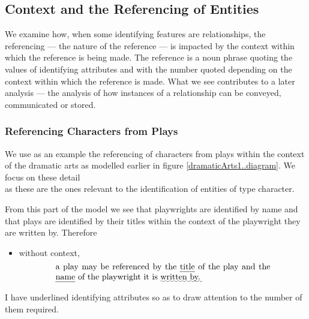 \subsection{Context and the Referencing of Entities}
\mynote
We examine how,  when some identifying features are relationships, the referencing 
--- the nature of the reference ---   
is impacted by the context within which the reference is being made. 
The reference is  a noun phrase quoting the values of identifying attributes
and with the number quoted depending on 
the context within which the reference is made.
What we see contributes to a later analysis --- the analysis of  how 
instances of a relationship can be conveyed, communicated or stored.
\subsubsection{Referencing Characters from Plays}
\mynote
 We use as an example the referencing of characters from  plays
 within the context of  the  dramatic arts
   as modelled earlier in figure \ref{dramaticArts1..diagram}.
We focus on these detail
\begin{equation*}

\end{equation*}
as these are the ones relevant to the identification of entities 
of type character.

From this part of the model we see that playwrights are identified by name and that plays are identified by their titles within the context of the playwright they are written by. Therefore
\begin{itemize} 
\item without context, 
\begin{equation} 
\label{absolutePlayReferencing}
\text{\parbox{9cm}{a  play 
may be referenced by the \uline{title} of the play and the \uline{name} of the playwright it is \uwave{written by.}}}
\end{equation}
\end{itemize}
I have underlined  identifying attributes so as to draw attention to the number of them required.


